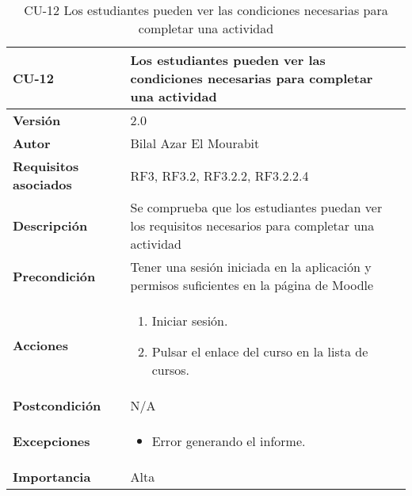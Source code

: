 \begin{table}[H]
	\centering
	\begin{tabularx}{\linewidth}{ p{} p{} }
		\toprule
		\textbf{CU-12}    & \textbf{Los estudiantes pueden ver las condiciones necesarias para completar una actividad}\\
		\toprule
		\textbf{Versión}              & 2.0   \\
		\textbf{Autor}                & Bilal Azar El Mourabit \\
		\textbf{Requisitos asociados} & RF3, RF3.2, RF3.2.2, RF3.2.2.4 \\
		\textbf{Descripción}          & Se comprueba que los estudiantes puedan ver los requisitos necesarios para completar una actividad\\
    		\textbf{Precondición}         & Tener una sesión iniciada en la aplicación y permisos suficientes en la página de Moodle \\
		\textbf{Acciones}             & 
		\begin{enumerate}
			\def\labelenumi{\arabic{enumi}.}
			\tightlist
			\item Iniciar sesión.
            \item Pulsar el enlace del curso en la lista de cursos. 
		\end{enumerate}\\
		\textbf{Postcondición}        & N/A \\
		\textbf{Excepciones}          & \begin{itemize}
		    \item Error generando el informe.
		\end{itemize} \\
		\textbf{Importancia}          & Alta \\
		\bottomrule
	\end{tabularx}
	\caption{CU-12 Los estudiantes pueden ver las condiciones necesarias para completar una actividad}
\end{table}


